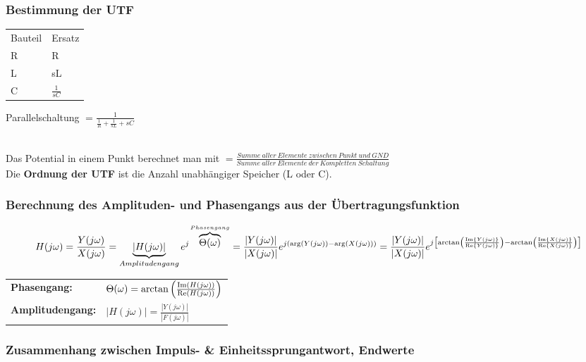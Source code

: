 		\subsubsection{Bestimmung der UTF}
		\parbox{10cm}{
			\begin{tabular}{ll}
				Bauteil & Ersatz \\
				R & R\\
				L & sL\\
				C & $\frac{1}{sC}$ \\
			\end{tabular}
			Parallelschaltung $= \frac{1}{\frac{1}{R}+\frac{1}{sL}+sC}$\\ \\}
		\parbox{6cm}{
			
			Das Potential in einem Punkt berechnet man mit $=\frac{Summe\ aller\
			Elemente\ zwischen\ Punkt\ und\ GND}{Summe\ aller\ Elemente\ der\ Kompletten\ Schaltung}$\\
			Die \textbf{Ordnung der UTF} ist die Anzahl unabhängiger Speicher (L oder C).}
		
		
		\subsubsection{Berechnung des Amplituden- und Phasengangs aus der Übertragungsfunktion}
			
			$$H(j \omega) = \frac{Y(j \omega)}{X(j \omega)} = \underbrace{|H(j
			\omega)|}_{Amplitudengang} e^{j\overbrace{\Theta(\omega)}^{Phasengang}} = 
			\frac{|Y(j \omega)|}{|X(j \omega)|} e^{j (\arg(Y(j \omega)) - \arg(X(j
			\omega)))} =
			\frac{|Y(j \omega)|}{|X(j \omega)|} e^{j \left[\arctan \left(\frac{\operatorname{Im}\{Y(j
			\omega)\}}{\operatorname{Re}\{Y(j \omega)\}} \right) - \arctan \left(\frac{\operatorname{Im}\{X(j
			\omega)\}}{\operatorname{Re}\{X(j \omega)\}} \right)\right]}$$
			
			\begin{tabular}{ll}
				\textbf{Phasengang:} & 
				$\Theta(\omega) = \arctan \left(\frac{\operatorname{Im} (H(j\omega))}{\operatorname{Re} (H(j\omega))}\right) \nonumber$ \\
				\textbf{Amplitudengang:} &
				$|H(j\omega)| = \frac{|Y(j\omega)|}{|F(j\omega)|} \nonumber$
			\end{tabular}
		
		
		\subsubsection{Zusammenhang zwischen Impuls- \& Einheitssprungantwort, Endwerte }
		
